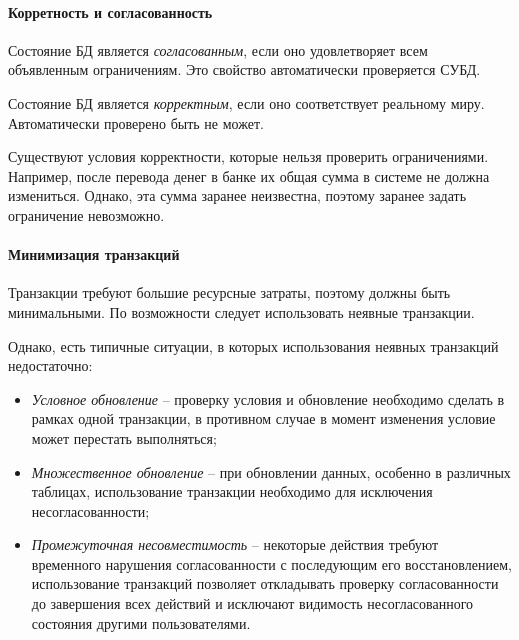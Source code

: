 \paragraph{Корретность и согласованность}

\begin{definition}
	Состояние БД является \textit{согласованным}, если оно удовлетворяет всем объявленным ограничениям.
	Это свойство автоматически проверяется СУБД.
\end{definition}

\begin{definition}
	Состояние БД является \textit{корректным}, если оно соответствует реальному миру. Автоматически
	проверено быть не может.
\end{definition}

Существуют условия корректности, которые нельзя проверить ограничениями. Например, после перевода
денег в банке их общая сумма в системе не должна измениться. Однако, эта сумма заранее неизвестна,
поэтому заранее задать ограничение невозможно.

\paragraph{Минимизация транзакций}

Транзакции требуют большие ресурсные затраты, поэтому должны быть минимальными. По возможности
следует использовать неявные транзакции.

Однако, есть типичные ситуации, в которых использования неявных транзакций недостаточно:

\begin {itemize}
\item \textit{Условное обновление} -- проверку условия и обновление
необходимо сделать в рамках одной транзакции, в противном случае в момент изменения условие может
перестать выполняться; \item \textit{Множественное обновление} -- при обновлении данных, особенно в различных
таблицах, использование транзакции необходимо для исключения несогласованности; \item
\textit{Промежуточная несовместимость} -- некоторые действия требуют временного нарушения согласованности с
последующим его восстановлением, использование транзакций позволяет откладывать проверку
согласованности до завершения всех действий и исключают видимость несогласованного состояния
другими пользователями. \end {itemize}

